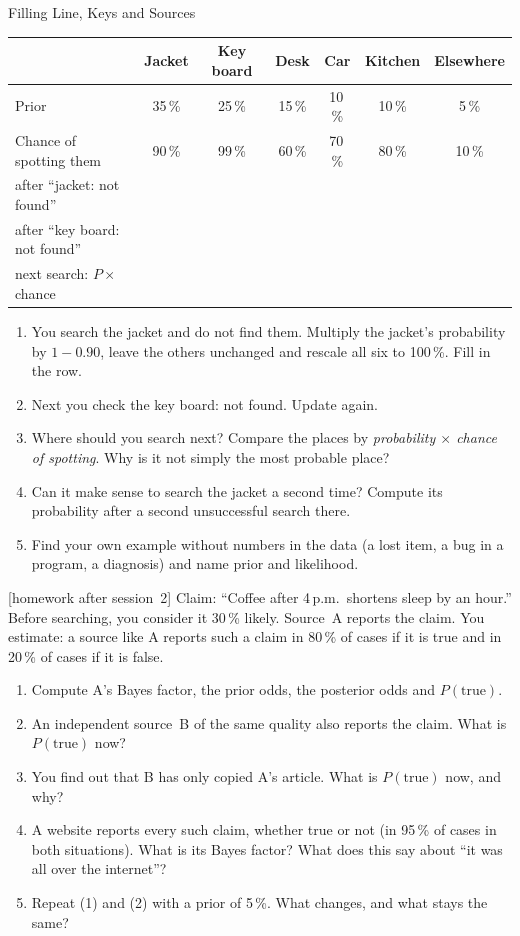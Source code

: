 \begin{uebungsblattc}{Filling Line, Keys and Sources}
\begin{center}
\small
\renewcommand{\arraystretch}{1.7}
\begin{tabular}{@{}lcccccc@{}}
\toprule
 & \textbf{Jacket} & \textbf{Key board} & \textbf{Desk} & \textbf{Car} & \textbf{Kitchen} & \textbf{Elsewhere} \\
\midrule
Prior & 35\,\% & 25\,\% & 15\,\% & 10\,\% & 10\,\% & 5\,\% \\
Chance of spotting them & 90\,\% & 99\,\% & 60\,\% & 70\,\% & 80\,\% & 10\,\% \\
\midrule
after \enquote{jacket: not found} & & & & & & \\
after \enquote{key board: not found} & & & & & & \\
next search: $P\times$ chance & & & & & & \\
\bottomrule
\end{tabular}
\end{center}
\begin{enumerate}
  \item You search the jacket and do not find them. Multiply the jacket's
    probability by $1-0.90$, leave the others unchanged and rescale all
    six to 100\,\%. Fill in the row.
  \item Next you check the key board: not found. Update again.
  \item Where should you search next? Compare the places by
    \emph{probability $\times$ chance of spotting}. Why is it not simply
    the most probable place?
  \item Can it make sense to search the jacket a second time? Compute its
    probability after a second unsuccessful search there.
  \item Find your own example without numbers in the data (a lost item,
    a bug in a program, a diagnosis) and name prior and likelihood.
\end{enumerate}

[homework after session~2]
Claim: \enquote{Coffee after 4\,p.m.\ shortens sleep by an hour.} Before
searching, you consider it 30\,\% likely. Source~A reports the claim. You
estimate: a source like A reports such a claim in 80\,\% of cases if it
is true and in 20\,\% of cases if it is false.
\begin{enumerate}
  \item Compute A's Bayes factor, the prior odds, the posterior odds and
    $P(\text{true})$.
  \item An independent source~B of the same quality also reports the
    claim. What is $P(\text{true})$ now?
  \item You find out that B has only copied A's article. What is
    $P(\text{true})$ now, and why?
  \item A website reports every such claim, whether true or not (in 95\,\%
    of cases in both situations). What is its Bayes factor? What does
    this say about \enquote{it was all over the internet}?
  \item Repeat (1) and (2) with a prior of 5\,\%. What changes, and what
    stays the same?
\end{enumerate}


\end{uebungsblattc}
